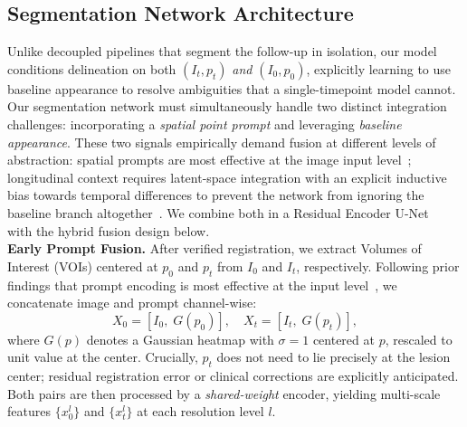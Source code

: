 \subsection{Segmentation Network Architecture}

Unlike decoupled pipelines that segment the follow-up in isolation, our model conditions delineation on both $(I_t, p_t)$ \emph{and} $(I_0, p_0)$, explicitly learning to use baseline appearance to resolve ambiguities that a single-timepoint model cannot. Our segmentation network must simultaneously handle two distinct integration challenges: incorporating a \textit{spatial point prompt} and leveraging \textit{baseline appearance}. These two signals empirically demand fusion at different levels of abstraction: spatial prompts are most effective at the image input level~\cite{nnInteractive,scribbleprompt}; longitudinal context requires latent-space integration with an explicit inductive bias towards temporal differences to prevent the network from ignoring the baseline branch altogether~\cite{longiseg,denner2020spatio}. We combine both in a Residual Encoder U-Net~\cite{nnunet_revisited} with the hybrid fusion design below.\\


\noindent\textbf{Early Prompt Fusion.}
After verified registration, we extract Volumes of Interest (VOIs) centered at $p_0$ and $p_t$ from $I_0$ and $I_t$, respectively. Following prior findings that prompt encoding is most effective at the input level~\cite{nnInteractive, scribbleprompt}, we concatenate image and prompt channel-wise:
\begin{equation}
    X_0 = [I_0,\; G(p_0)], \quad X_t = [I_t,\; G(p_t)],
\end{equation}
where $G(p)$ denotes a Gaussian heatmap with $\sigma=1$ centered at $p$, rescaled to unit value at the center. Crucially, $p_t$ does not need to lie precisely at the lesion center; residual registration error or clinical corrections are explicitly anticipated. Both pairs are then processed by a \textit{shared-weight} encoder, yielding multi-scale features $\{x_0^l\}$ and $\{x_t^l\}$ at each resolution level $l$.\\

